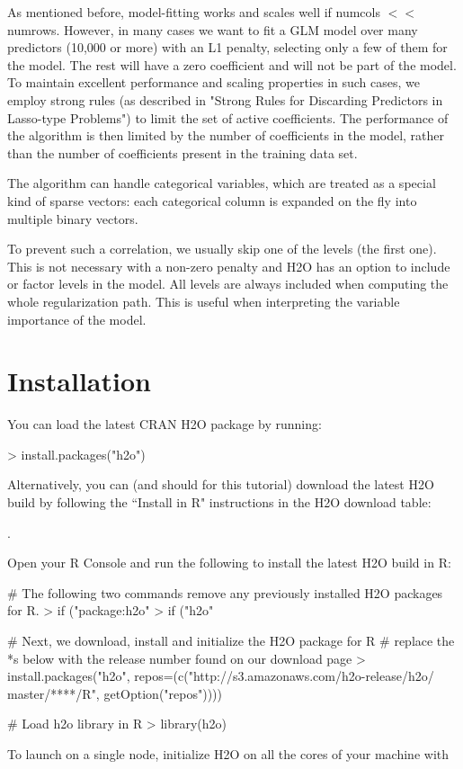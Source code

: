 \documentclass[11pt]{article}
\begin{document}
As mentioned before, model-fitting works and scales well if numcols $<<$ numrows. However, in many cases we want to fit a GLM model over many predictors (10,000 or more) with an L1 penalty, selecting only a few of them for the model. The rest will have a zero coefficient and will not be part of the model. To maintain excellent performance and scaling properties in such cases, we employ strong rules  (as described in "Strong Rules for Discarding Predictors in Lasso-type Problems") to limit the set of active coefficients. The performance of the algorithm is then limited by the number of coefficients in the model, rather than the number of coefficients present in the training data set. 

The algorithm can handle categorical variables, which are treated as a special kind of sparse vectors: each categorical column is expanded on the fly into multiple binary vectors. 



To prevent such a correlation, we usually skip one of the levels (the first one). This is not necessary with a non-zero penalty and H2O has an option to include or factor levels in the model. All levels are always included when computing the whole regularization path. This is useful when interpreting the variable importance of the model. 

\section{Installation} 

You can load the latest CRAN H2O package by running:

\begin{spverbatim}
> install.packages("h2o")
\end{spverbatim}
\bigskip
\noindent
Alternatively, you can (and should for this tutorial) download the latest H2O build by following the ``Install in R" instructions in the H2O download table:

\indent \indent \indent {}.

\noindent
Open your R Console and run the following to install the latest H2O build in R:

\begin{spverbatim}
# The following two commands remove any previously installed H2O packages for R.
> if ("package:h2o" %
> if ("h2o" %

# Next, we download, install and initialize the H2O package for R
# replace the *s below with the release number found on our download page
> install.packages("h2o", repos=(c("http://s3.amazonaws.com/h2o-release/h2o/
master/****/R", getOption("repos"))))

# Load h2o library in R
> library(h2o)

\end{spverbatim}
\noindent
To launch on a single node, initialize H2O on all the cores of your machine with
\end{document}
